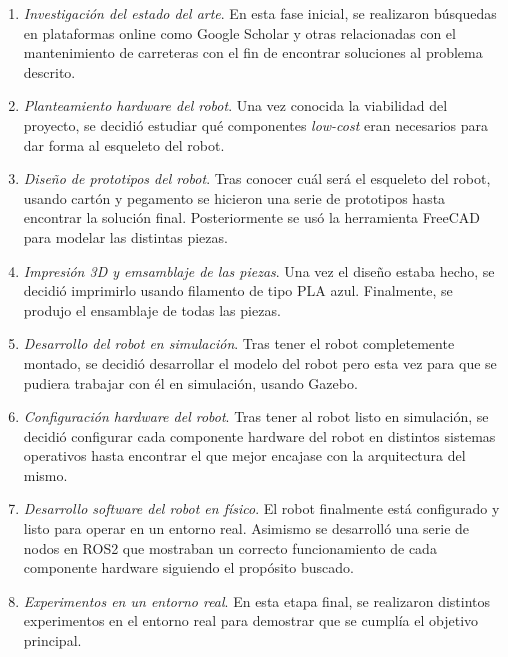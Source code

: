 \begin{enumerate}
	\item{\textit{Investigación del estado del arte}}. En esta fase inicial, se realizaron búsquedas en plataformas online como Google Scholar y otras relacionadas con el mantenimiento de carreteras con el fin de encontrar soluciones al problema descrito. 
	
	\item{\textit{Planteamiento hardware del robot}}. Una vez conocida la viabilidad del proyecto, se decidió estudiar qué componentes \textit{low-cost} eran necesarios para dar forma al esqueleto del robot. 
	
	\item{\textit{Diseño de prototipos del robot}}. Tras conocer cuál será el esqueleto del robot, usando cartón y pegamento se hicieron una serie de prototipos hasta encontrar la solución final. Posteriormente se usó la herramienta FreeCAD para modelar las distintas piezas.
	
	\item{\textit{Impresión 3D y emsamblaje de las piezas}}. Una vez el diseño estaba hecho, se decidió imprimirlo usando filamento de tipo PLA azul. Finalmente, se produjo el ensamblaje de todas las piezas.
	
	\item{\textit{Desarrollo del robot en simulación}}. Tras tener el robot completemente montado, se decidió desarrollar el modelo del robot pero esta vez para que se pudiera trabajar con él en simulación, usando Gazebo.
	
	\item{\textit{Configuración hardware del robot}}. Tras tener al robot listo en simulación, se decidió configurar cada componente hardware del robot en distintos sistemas operativos hasta encontrar el que mejor encajase con la arquitectura del mismo. 
	
	\item{\textit{Desarrollo software del robot en físico}}. El robot finalmente está configurado y listo para operar en un entorno real. Asimismo se desarrolló una serie de nodos en ROS2 que mostraban un correcto funcionamiento de cada componente hardware siguiendo el propósito buscado. 
	
	\item{\textit{Experimentos en un entorno real}}. En esta etapa final, se realizaron distintos experimentos en el entorno real para demostrar que se cumplía el objetivo principal.

\end{enumerate}


